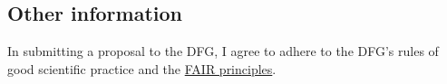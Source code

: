 \subsection{Other information}
In submitting a proposal to the DFG, I agree to adhere to the DFG's rules of good scientific practice and the \href{https://www.nature.com/articles/sdata201618}{FAIR principles}.

